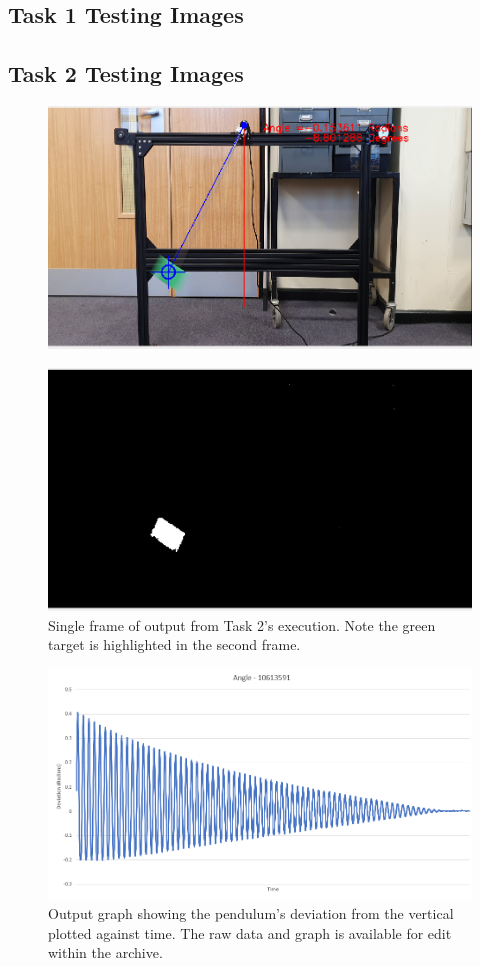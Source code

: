 \documentclass[conference]{IEEEtran}
\begin{document}
\newpage
\appendix

\printbibliography


\onecolumn
\subsection{Task 1 Testing Images}\label{app:T1}
\subsection{Task 2 Testing Images}\label{app:T2}

\begin{figure}[H]
\centering
\includegraphics[width=6in]{t2_output2}
\end{figure}
\begin{figure}[H]
\centering
\includegraphics[width=6in]{t2_output3}
\caption{Single frame of output from Task 2's execution. Note the green target is highlighted in the second frame.}
\label{fig_t2output}
\end{figure}

\begin{figure}[H]
\centering
\includegraphics[width=6in]{t2_graph}
\caption{Output graph showing the pendulum's deviation from the vertical plotted against time. The raw data and graph is available for edit within the archive.}
\label{fig_t2graph}
\end{figure}


\end{document}
